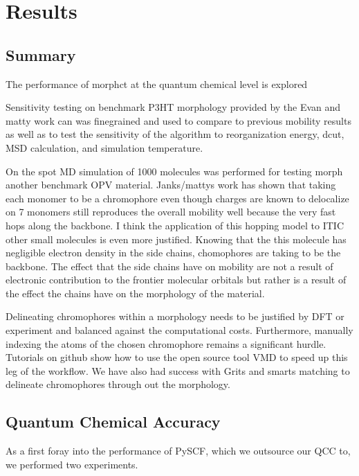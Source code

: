 \chapter{Results}
\label{chap:results}

\section{Summary}

The performance of morphct at the quantum chemical level is explored

Sensitivity testing on benchmark P3HT morphology provided by the Evan and matty work can was finegrained and
used to compare to previous mobility results as well as to test the sensitivity of the algorithm to
reorganization energy, dcut, MSD calculation, and simulation temperature.

On the spot MD simulation of 1000
molecules was performed for testing morph another benchmark OPV material. Janks/mattys work has shown that taking
each monomer to be a chromophore even though charges are known to delocalize on 7 monomers still reproduces
the overall mobility well because the very fast hops along the backbone. I think the application of this
hopping model to ITIC other small molecules is even more justified. Knowing that the this molecule has
negligible electron density in the side chains, chomophores are taking to be the backbone. The effect that
the side chains have on mobility are not a result of electronic contribution to the frontier molecular
orbitals but rather is a result of the effect the chains have on the morphology of the material. 

Delineating chromophores within a morphology needs to be justified by DFT or experiment and balanced against
the computational costs. Furthermore, manually indexing the atoms of the chosen chromophore
remains a significant hurdle. Tutorials on github show how to use the open source tool VMD to speed up this
leg of the workflow. We have also had success with Grits and smarts matching to delineate chromophores through
out the morphology. 

\section{Quantum Chemical Accuracy}

As a first foray into the performance of PySCF, which we outsource our QCC to, we performed two experiments.

